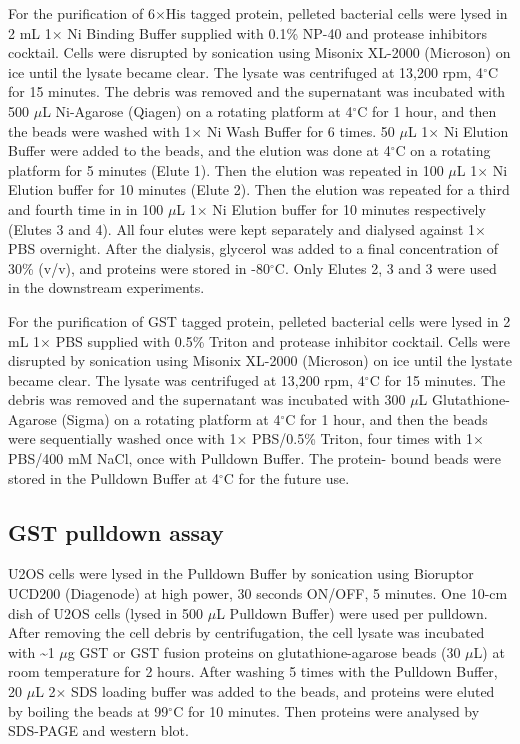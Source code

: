 For the purification of 6$\times$His tagged protein, pelleted bacterial cells were lysed in 2 mL 1$\times$ Ni Binding Buffer supplied with 0.1\% NP-40 and protease inhibitors cocktail. Cells were disrupted by sonication using Misonix XL-2000 (Microson) on ice until the lysate became clear. The lysate was centrifuged at 13,200 rpm, 4$^\circ$C for 15 minutes. The debris was removed and the supernatant was incubated with 500 $\mu$L Ni-Agarose (Qiagen) on a rotating platform at 4$^\circ$C for 1 hour, and then the beads were washed with 1$\times$ Ni Wash Buffer for 6 times. 50 $\mu$L 1$\times$ Ni Elution Buffer were added to the beads, and the elution was done at 4$^\circ$C on a rotating platform for 5 minutes (Elute 1). Then the elution was repeated in 100 $\mu$L 1$\times$ Ni Elution buffer for 10 minutes (Elute 2). Then the elution was repeated for a third and fourth time in in 100 $\mu$L 1$\times$ Ni Elution buffer for 10 minutes respectively (Elutes 3 and 4). All four elutes were kept separately and dialysed against 1$\times$ PBS overnight. After the dialysis, glycerol was added to a final concentration of 30\% (v/v), and proteins were stored in -80$^\circ$C. Only Elutes 2, 3 and 3 were used in the downstream experiments.

For the purification of GST tagged protein, pelleted bacterial cells were lysed in 2 mL 1$\times$ PBS supplied with 0.5\% Triton and protease inhibitor cocktail. Cells were disrupted by sonication using Misonix XL-2000 (Microson) on ice until the lystate became clear. The lysate was centrifuged at 13,200 rpm, 4$^\circ$C for 15 minutes. The debris was removed and the supernatant was incubated with 300 $\mu$L Glutathione-Agarose (Sigma) on a rotating platform at 4$^\circ$C for 1 hour, and then the beads were sequentially washed once with 1$\times$ PBS/0.5\% Triton, four times with 1$\times$ PBS/400 mM NaCl, once with Pulldown Buffer. The protein- bound beads were stored in the Pulldown Buffer at 4$^\circ$C for the future use.

\subsection{GST pulldown assay}

U2OS cells were lysed in the Pulldown Buffer by sonication using Bioruptor UCD200 (Diagenode) at high power, 30 seconds ON/OFF, 5 minutes. One 10-cm dish of U2OS cells (lysed in 500 $\mu$L Pulldown Buffer) were used per pulldown. After removing the cell debris by centrifugation, the cell lysate was incubated with \textasciitilde 1 $\mu$g GST or GST fusion proteins on glutathione-agarose beads (30 $\mu$L) at room temperature for 2 hours. After washing 5 times with the Pulldown Buffer, 20 $\mu$L 2$\times$ SDS loading buffer was added to the beads, and proteins were eluted by boiling the beads at 99$^\circ$C for 10 minutes. Then proteins were analysed by SDS-PAGE and western blot.

